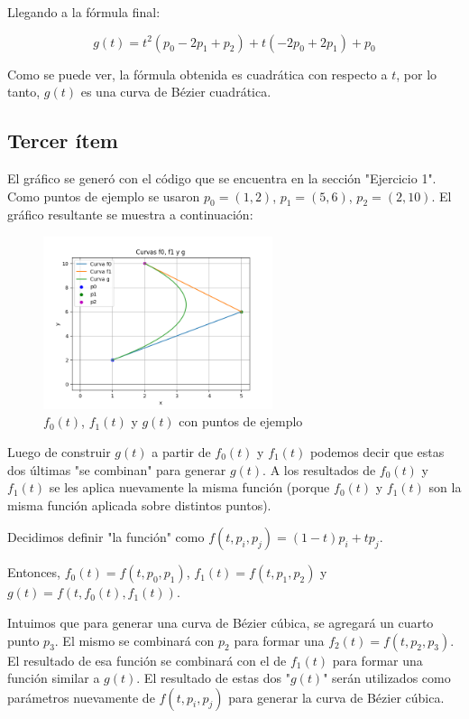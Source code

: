 \documentclass{article}
\begin{document}
Llegando a la fórmula final:

$$
g(t) = t^2 (p_0 - 2 p_1 + p_2) + t (-2 p_0 + 2 p_1) + p_0
$$

Como se puede ver, la fórmula obtenida es cuadrática con respecto a $t$, por lo tanto, $g(t)$ es una curva de Bézier cuadrática.
\subsection*{Tercer ítem}
El gráfico se generó con el código que se encuentra en la sección "Ejercicio 1". Como puntos de ejemplo se usaron $p_0 = (1, 2)$, $p_1 = (5, 6)$, $p_2 = (2, 10)$. El gráfico resultante se muestra  a continuación:

\begin{figure}[H]
    \centering
    \includegraphics[width=0.6\textwidth]{imagenes/graf_ej1.png}
    \caption{$f_0(t)$, $f_1(t)$ y $g(t)$ con puntos de ejemplo}
    \label{fig:ejemplo}
\end{figure}

Luego de construir $g(t)$ a partir de $f_0(t)$ y $f_1(t)$ podemos decir que estas dos últimas "se combinan" para generar  $g(t)$. A los resultados de $f_0(t)$ y $f_1(t)$ se les aplica nuevamente la misma función (porque $f_0(t)$ y $f_1(t)$ son la misma función aplicada sobre distintos puntos).

Decidimos definir "la función" como $f(t, p_i, p_j) = (1-t) p_i + t p_j$.

Entonces, $f_0(t) = f(t, p_0, p_1)$, $f_1(t) = f(t, p_1, p_2)$ y $g(t) = f(t, f_0(t), f_1(t))$.

Intuimos que para generar una curva de Bézier cúbica, se agregará un cuarto punto $p_3$. El mismo se combinará con $p_2$ para formar una $f_2(t) = f(t, p_2, p_3)$. El resultado de esa función se combinará con el de $f_1(t)$ para formar una función similar a $g(t)$. El resultado de estas dos "$g(t)$" serán utilizados como parámetros nuevamente de $f(t, p_i, p_j)$ para generar la curva de Bézier cúbica.
\end{document}
